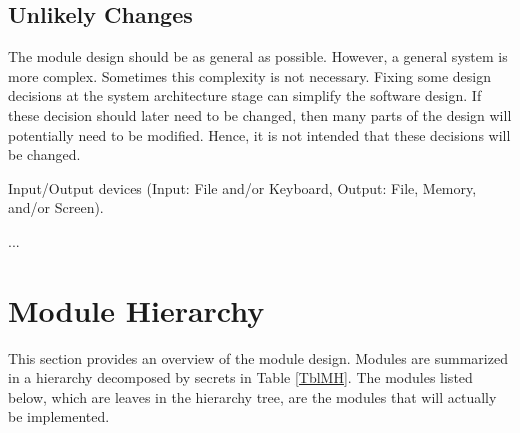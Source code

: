 \documentclass[12pt, titlepage]{article}
\newcounter{ucnum}
\newcommand{\uctheucnum}{UC\theucnum}
\begin{document}
\subsection{Unlikely Changes} \label{SecUchange}

The module design should be as general as possible. However, a general system is
more complex. Sometimes this complexity is not necessary. Fixing some design
decisions at the system architecture stage can simplify the software design. If
these decision should later need to be changed, then many parts of the design
will potentially need to be modified. Hence, it is not intended that these
decisions will be changed.

\begin{description}
	\item[ \uctheucnum \label{ucIO}:] Input/Output devices
	(Input: File and/or Keyboard, Output: File, Memory, and/or Screen).
	\item ...
\end{description}

\section{Module Hierarchy} \label{SecMH}

This section provides an overview of the module design. Modules are summarized
in a hierarchy decomposed by secrets in Table \ref{TblMH}. The modules listed
below, which are leaves in the hierarchy tree, are the modules that will
actually be implemented.
\end{document}
